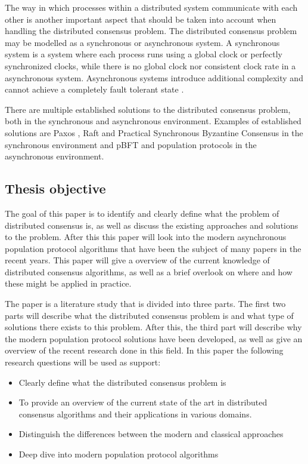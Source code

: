 The way in which processes within a distributed system communicate with each other is another important aspect that should be taken into account when handling the distributed consensus problem. The distributed consensus problem may be modelled as a synchronous or asynchronous system. A synchronous system is a system where each process runs using a global clock or perfectly synchronized clocks, while there is no global clock nor consistent clock rate in a asynchronous system. Asynchronous systems introduce additional complexity and cannot achieve a completely fault tolerant state \cite{fischerImpossibilityDistributedConsensus}.

There are multiple established solutions to the distributed consensus problem, both in the synchronous and asynchronous environment. Examples of established solutions are Paxos \cite{lamportFastPaxos2006}, Raft \cite{ongaroSearchUnderstandableConsensus} and Practical Synchronous Byzantine Consensus \cite{renPracticalSynchronousByzantine} in the synchronous environment and pBFT \cite{castroPracticalByzantineFault} and population protocols \cite{aspnesIntroductionPopulationProtocols2009} in the asynchronous environment.

\clearpage

\subsection{Thesis objective}
The goal of this paper is to identify and clearly define what the problem of distributed consensus is,
as well as discuss the existing approaches and solutions to the problem. After this this paper will look into the modern asynchronous population protocol algorithms that have been the subject of many papers in the recent years. 
This paper will give a overview of the current knowledge of distributed consensus algorithms, as well as a brief overlook on where and how these might be applied in practice.

The paper is a literature study that is divided into three parts. The first two parts will describe what the distributed consensus problem is and what type of solutions there exists to this problem. After this, the third part will describe why the modern population protocol solutions have been developed, as well as give an overview of the recent research done in this field. In this paper the following research questions will be used as support:

\begin{itemize}
    \item Clearly define what the distributed consensus problem is
    \item To provide an overview of the current state of the art in distributed consensus algorithms and their applications in various domains.
    \item Distinguish the differences between the modern and classical approaches
    \item Deep dive into modern population protocol algorithms
\end{itemize}

\subsection{}

\clearpage